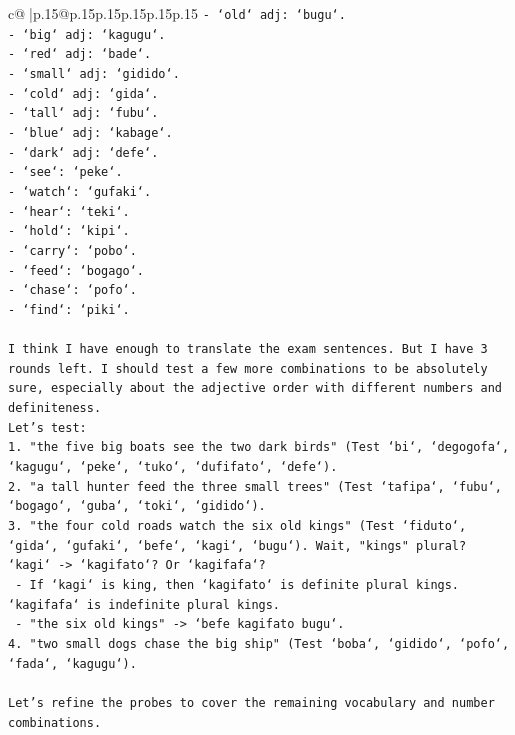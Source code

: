 \documentclass{article}
\begin{document}
{\begin{supertabular}{c@{$\;$}|p{.15\linewidth}@{}p{.15\linewidth}p{.15\linewidth}p{.15\linewidth}p{.15\linewidth}p{.15\linewidth}}
{{{\texttt{{-} `old` adj: `bugu`.} \\
\texttt{{-} `big` adj: `kagugu`.} \\
\texttt{{-} `red` adj: `bade`.} \\
\texttt{{-} `small` adj: `gidido`.} \\
\texttt{{-} `cold` adj: `gida`.} \\
\texttt{{-} `tall` adj: `fubu`.} \\
\texttt{{-} `blue` adj: `kabage`.} \\
\texttt{{-} `dark` adj: `defe`.} \\
\texttt{{-} `see`: `peke`.} \\
\texttt{{-} `watch`: `gufaki`.} \\
\texttt{{-} `hear`: `teki`.} \\
\texttt{{-} `hold`: `kipi`.} \\
\texttt{{-} `carry`: `pobo`.} \\
\texttt{{-} `feed`: `bogago`.} \\
\texttt{{-} `chase`: `pofo`.} \\
\texttt{{-} `find`: `piki`.} \\
\\ 
\texttt{I think I have enough to translate the exam sentences. But I have 3 rounds left. I should test a few more combinations to be absolutely sure, especially about the adjective order with different numbers and definiteness.} \\
\texttt{Let's test:} \\
\texttt{1. "the five big boats see the two dark birds" (Test `bi`, `degogofa`, `kagugu`, `peke`, `tuko`, `dufifato`, `defe`).} \\
\texttt{2. "a tall hunter feed the three small trees" (Test `tafipa`, `fubu`, `bogago`, `guba`, `toki`, `gidido`).} \\
\texttt{3. "the four cold roads watch the six old kings" (Test `fiduto`, `gida`, `gufaki`, `befe`, `kagi`, `bugu`). Wait, "kings" plural? `kagi` {-}> `kagifato`? Or `kagifafa`?} \\
\texttt{   {-} If `kagi` is king, then `kagifato` is definite plural kings. `kagifafa` is indefinite plural kings.} \\
\texttt{   {-} "the six old kings" {-}> `befe kagifato bugu`.} \\
\texttt{4. "two small dogs chase the big ship" (Test `boba`, `gidido`, `pofo`, `fada`, `kagugu`).} \\
\\ 
\texttt{Let's refine the probes to cover the remaining vocabulary and number combinations.} \\
}}}
\end{supertabular}}
\end{document}
